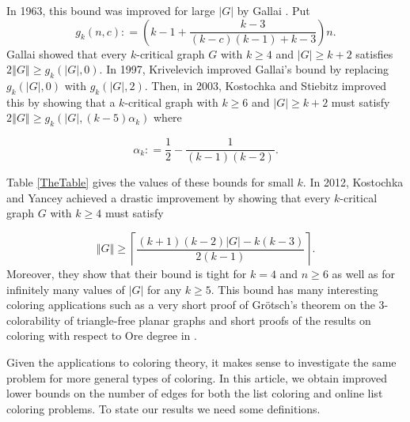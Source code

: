 \documentclass[10pt]{article}
\theoremstyle{plain}
\theoremstyle{definition}
\theoremstyle{remark}
\newcommand{\card}[1]{\left|#1\right|}
\newcommand{\size}[1]{\left\Vert#1\right\Vert}
\newcommand{\ceil}[1]{\left\lceil#1\right\rceil}
\newcommand{\parens}[1]{\left( #1 \right)}
\newcommand{\DefinedAs}{\mathrel{\mathop:}=}
\begin{document}
In 1963, this bound was improved for large $\card{G}$ by Gallai \cite{gallai1963kritische}.  Put 
\[g_k(n, c) \DefinedAs \parens{k-1 + \frac{k-3}{(k-c)(k-1) + k-3}}n.\]
Gallai showed that every $k$-critical graph $G$ with $k \ge 4$ and $\card{G} \ge k+2$ satisfies $2\size{G} \ge g_k(\card{G}, 0)$.  In 1997, Krivelevich \cite{krivelevich1997minimal} improved Gallai's bound by replacing $g_k(\card{G}, 0)$ with $g_k(\card{G}, 2)$.  Then, in 2003, Kostochka and Stiebitz \cite{kostochkastiebitzedgesincriticalgraph} improved this by showing that a $k$-critical graph with $k \ge 6$ and $\card{G} \ge k+2$ must satisfy $2\size{G} \ge g_k(\card{G}, (k-5)\alpha_k)$ where

\[\alpha_k \DefinedAs \frac12 - \frac{1}{(k-1)(k-2)}.\]

Table \ref{TheTable} gives the values of these bounds for small $k$.  In 2012, Kostochka and Yancey \cite{kostochkayancey2012ore} achieved a drastic improvement by showing that every $k$-critical graph $G$ with $k \ge 4$ must satisfy

\[\size{G} \ge \ceil{\frac{(k+1)(k-2)\card{G} - k(k-3)}{2(k-1)}}.\]%
Moreover, they show that their bound is tight for $k=4$ and $n \ge 6$ as well as for infinitely many values of $\card{G}$ for any $k \ge 5$.  This bound has many interesting coloring applications such as a very short proof of Gr\"otsch's theorem on the $3$-colorability of triangle-free planar graphs \cite{kostochka2012oregrotsch} and short proofs of the results on coloring with respect to Ore degree in \cite{kierstead2009ore, rabern2010a, krs_one}.  %

Given the applications to coloring theory, it makes sense to investigate the same problem for more general types of coloring.  In this article, we obtain improved lower bounds on the number of edges for both the list coloring and online list coloring problems.  To state our results we need some definitions.
\end{document}
